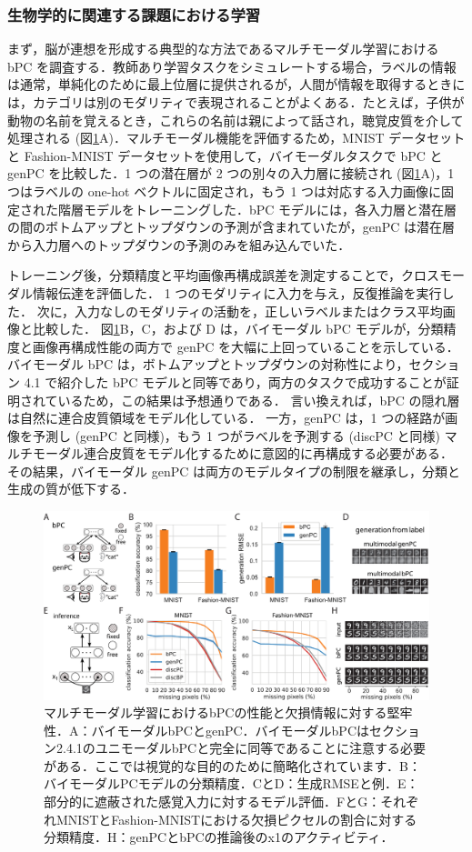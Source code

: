 \documentclass[a4paper, titlepage]{jsarticle}
\begin{document}
\subsubsection{生物学的に関連する課題における学習}
まず，脳が連想を形成する典型的な方法であるマルチモーダル学習における bPC を調査する．教師あり学習タスクをシミュレートする場合，ラベルの情報は通常，単純化のために最上位層に提供されるが，人間が情報を取得するときには，カテゴリは別のモダリティで表現されることがよくある．たとえば，子供が動物の名前を覚えるとき，これらの名前は親によって話され，聴覚皮質を介して処理される (図\ref{ex_result5}A)．マルチモーダル機能を評価するため，MNIST データセットと Fashion-MNIST データセットを使用して，バイモーダルタスクで bPC と genPC を比較した．1 つの潜在層が 2 つの別々の入力層に接続され (図\ref{ex_result5}A)，1 つはラベルの one-hot ベクトルに固定され，もう 1 つは対応する入力画像に固定された階層モデルをトレーニングした．bPC モデルには，各入力層と潜在層の間のボトムアップとトップダウンの予測が含まれていたが，genPC は潜在層から入力層へのトップダウンの予測のみを組み込んでいた．
\par
トレーニング後，分類精度と平均画像再構成誤差を測定することで，クロスモーダル情報伝達を評価した． 1 つのモダリティに入力を与え，反復推論を実行した． 次に，入力なしのモダリティの活動を，正しいラベルまたはクラス平均画像と比較した． 図\ref{ex_result5}B，C，および D は，バイモーダル bPC モデルが，分類精度と画像再構成性能の両方で genPC を大幅に上回っていることを示している． バイモーダル bPC は，ボトムアップとトップダウンの対称性により，セクション 4.1 で紹介した bPC モデルと同等であり，両方のタスクで成功することが証明されているため，この結果は予想通りである． 言い換えれば，bPC の隠れ層は自然に連合皮質領域をモデル化している． 一方，genPC は，1 つの経路が画像を予測し (genPC と同様)，もう 1 つがラベルを予測する (discPC と同様) マルチモーダル連合皮質をモデル化するために意図的に再構成する必要がある． その結果，バイモーダル genPC は両方のモデルタイプの制限を継承し，分類と生成の質が低下する．
\begin{figure}[htbp]
   \centering
   \includegraphics[scale=0.23]{x7.png}
   \caption{マルチモーダル学習におけるbPCの性能と欠損情報に対する堅牢性．A：バイモーダルbPCとgenPC．バイモーダルbPCはセクション2.4.1のユニモーダルbPCと完全に同等であることに注意する必要がある．ここでは視覚的な目的のために簡略化されています．B：バイモーダルPCモデルの分類精度．CとD：生成RMSEと例．E：部分的に遮蔽された感覚入力に対するモデル評価．FとG：それぞれMNISTとFashion-MNISTにおける欠損ピクセルの割合に対する分類精度．H：genPCとbPCの推論後のx1のアクティビティ．}
   \label{ex_result5}
\end{figure}
\end{document}
